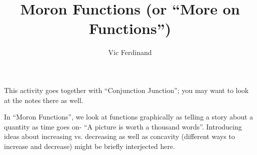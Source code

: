 \documentclass{ximera}
\author{Vic Ferdinand}
\title{Moron Functions (or ``More on Functions'')}
\begin{document}
\begin{abstract}
\end{abstract}
\maketitle

\begin{instructorIntro}
This activity goes together with ``Conjunction Junction''; you may want to look at the notes there as well.

In ``Moron Functions'', we look at functions graphically as telling a story about a quantity as time goes on- ``A picture is worth a thousand words''.  Introducing ideas about increasing vs. decreasing as well as concavity (different ways to increase and decrease) might be briefly interjected here.  
\end{instructorIntro}
\end{document}
